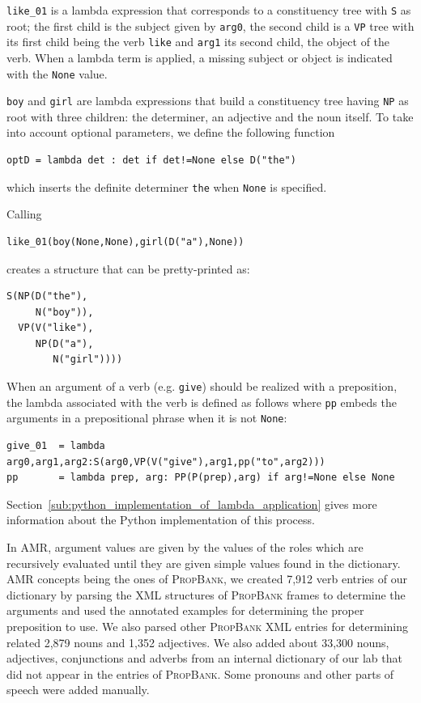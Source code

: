\documentclass[12pt]{article}
\newcommand{\systeme}[1]{\textsc{#1}}
\newcommand{\propbank}{\systeme{PropBank}}
\newcommand{\representation}[1]{\textsf{#1}}
\newcommand{\AMR}{\representation{AMR}}
\begin{document}
\lstinline{like_01} is a lambda expression that corresponds to a constituency tree with \lstinline{S} as root; the first child is the subject given by \lstinline{arg0}, the second child is a \texttt{VP} tree with its first child being the verb \lstinline{like} and \lstinline{arg1} its second child, the object of the verb. When a lambda term is applied, a missing subject or object is indicated with the \lstinline{None} value. 

\lstinline{boy} and \lstinline{girl} are lambda expressions that build a constituency tree having \texttt{NP} as root with three children: the determiner, an adjective and the noun itself. To take into account optional parameters, we define the following function 
\begin{lstlisting}[basicstyle=\footnotesize\ttfamily]
    optD = lambda det : det if det!=None else D("the")
\end{lstlisting}
which inserts the definite determiner \lstinline{the} when \texttt{None} is specified.

Calling
\begin{lstlisting}[basicstyle=\footnotesize\ttfamily]
   like_01(boy(None,None),girl(D("a"),None))
\end{lstlisting}

creates a structure that can be pretty-printed as:
\begin{lstlisting}[basicstyle=\footnotesize\ttfamily]
S(NP(D("the"),
     N("boy")),
  VP(V("like"),
     NP(D("a"),
        N("girl"))))
\end{lstlisting} 

When an argument of a verb (e.g. \lstinline{give}) should be realized with a preposition, the lambda associated with the verb is defined as follows where \lstinline{pp} embeds the arguments in a prepositional phrase when it is not \lstinline{None}:
\begin{lstlisting}[basicstyle=\footnotesize\ttfamily]
give_01  = lambda arg0,arg1,arg2:S(arg0,VP(V("give"),arg1,pp("to",arg2)))
pp       = lambda prep, arg: PP(P(prep),arg) if arg!=None else None
\end{lstlisting}
Section~\ref{sub:python_implementation_of_lambda_application} gives more information about the Python implementation of this process.
 
In \AMR{}, argument values are given by the values of the roles which are recursively evaluated until they are given simple values found in the dictionary. \AMR{} concepts being the ones of \propbank{}, we created 7,912 verb entries of our dictionary by parsing the XML structures of \propbank{} frames to determine the arguments and used the annotated examples for determining the proper preposition to use. 
We also parsed other \propbank{} XML entries for determining related 2,879 nouns and 1,352 adjectives. We also added about 33,300 nouns, adjectives, conjunctions and adverbs from an internal dictionary of our lab that did not appear in the entries of \propbank{}. Some pronouns and other parts of speech were added manually. 
\end{document}
